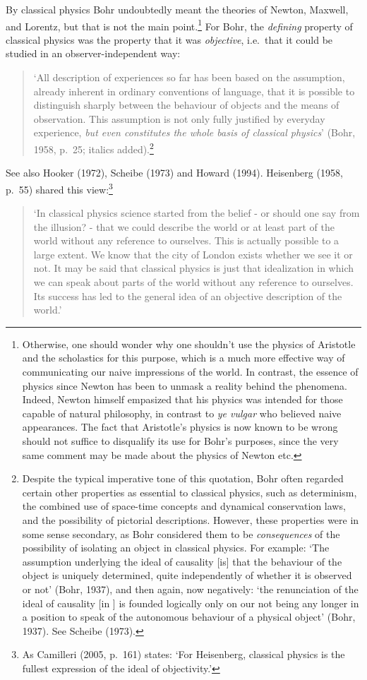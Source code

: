 \documentclass[12pt,titlepage]{article}
\begin{document}
 By classical physics Bohr undoubtedly meant the theories of Newton, Maxwell, and Lorentz, but that is not the main point.\footnote{Otherwise, one should wonder why one shouldn't use the physics of Aristotle and the scholastics for this purpose, which is a much more effective way of communicating  our naive impressions of the world. In contrast, the essence of physics since Newton has been to unmask a reality behind the phenomena. Indeed, Newton himself empasized that his physics was intended for those capable of natural philosophy, in contrast to  \textit{ye vulgar} who believed naive appearances.   The fact that Aristotle's physics is now known to be wrong should not suffice to disqualify its use for Bohr's purposes, since the very same comment may be made about the physics of Newton etc.} For Bohr, the \textit{defining} property of classical physics was the property that it was \textit{objective}, i.e.\ that it could be studied in an observer-independent way:
 \begin{quote}
`All description of experiences so far has been based on the assumption, already inherent in ordinary conventions of language, that it is possible to distinguish sharply between the behaviour of objects and the means of observation. This assumption is not only fully justified by everyday experience, {\it but even constitutes the whole basis of classical physics}'
(Bohr, 1958, p.\ 25; italics added).\footnote{Despite the typical imperative tone of this quotation, Bohr often regarded certain other properties as essential to classical physics, such as  determinism, the combined use of space-time concepts and dynamical conservation laws, and the possibility of pictorial descriptions. However, these properties were in some sense secondary,  as Bohr considered them to be  {\it consequences} of the possibility of isolating an object in classical physics. For example: `The assumption underlying the ideal of causality [is] that the behaviour of the object is uniquely determined, quite independently of whether it is observed or not' (Bohr, 1937), and then again, now negatively: `the renunciation of the ideal of causality [in \qm] is founded logically only on our not being any longer in a position to speak of the autonomous behaviour of a physical object' (Bohr, 1937).
See Scheibe (1973).} \end{quote}
 See also Hooker (1972), Scheibe (1973) and Howard (1994). Heisenberg (1958, p.\ 55)
shared this view:\footnote{As Camilleri (2005, p.\ 161) states: `For Heisenberg,
classical physics is the fullest expression of the ideal of objectivity.'}
 \begin{quote}
 `In classical physics science started from the belief - or should one say from the illusion? - that we could describe the world or at least part of the world without any reference to ourselves. This is actually possible to a large extent. We know that the city of London exists whether we see it or not. It may be said that classical physics is just that idealization in which we can speak about parts of the world without any reference to ourselves. Its success has led to the general idea of an objective description of the world.' \end{quote}
 
\end{document}

